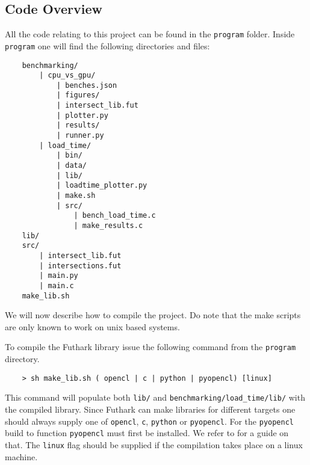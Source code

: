 \begin{appendices}
    \subsection*{Code Overview}
    All the code relating to this project can be found in the \texttt{program} folder.
    Inside \texttt{program} one will find the following directories and files:
\begin{simplebox}
    \begin{verbatim}
    benchmarking/
        | cpu_vs_gpu/
            | benches.json
            | figures/
            | intersect_lib.fut
            | plotter.py
            | results/
            | runner.py
        | load_time/
            | bin/
            | data/
            | lib/
            | loadtime_plotter.py
            | make.sh
            | src/
                | bench_load_time.c
                | make_results.c
    lib/
    src/
        | intersect_lib.fut
        | intersections.fut
        | main.py
        | main.c
    make_lib.sh
    \end{verbatim}
\end{simplebox}
    We will now describe how to compile the project. Do note that the make scripts are only known to work on unix based systems. \pagebreak

    To compile the Futhark library issue the following command from the \texttt{program} directory.
    \begin{simplebox}
        \begin{verbatim}
    > sh make_lib.sh ( opencl | c | python | pyopencl) [linux]
        \end{verbatim} 
    \end{simplebox}
    This command will populate both \texttt{lib/} and \texttt{benchmarking/load\_time/lib/} with the compiled library. Since Futhark can make libraries for different targets one should always supply one of \texttt{opencl}, \texttt{c}, \texttt{python} or \texttt{pyopencl}. For the \texttt{pyopencl} build to function \texttt{pyopencl} must first be installed. We refer to \cite{PYOPENCL} for a guide on that. The \texttt{linux} flag should be supplied if the compilation takes place on a linux machine.\\


\end{appendices}
